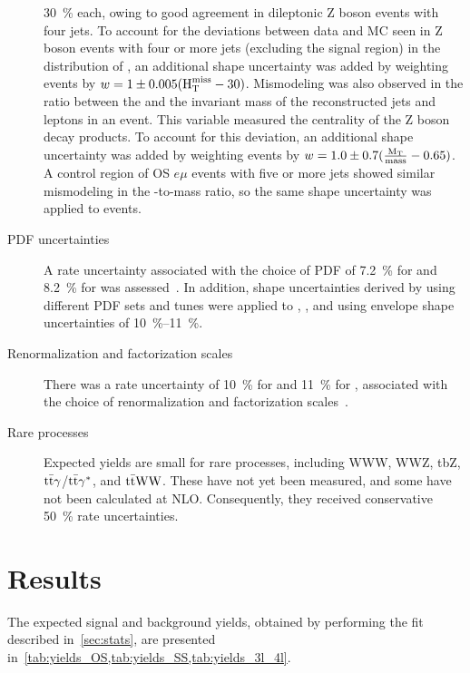 \begin{description}
    \SI{30}{\percent} each, owing to good agreement in dileptonic Z boson events
    with four jets. To account for the deviations between data and MC seen in Z
    boson events with four or more jets (excluding the \ttZ signal region) in
    the distribution of \HTmiss, an additional shape uncertainty was added by
    weighting events by $w = 1 \pm 0.005(\text{H}_\text{T}^\text{miss} - 30)$. Mismodeling was also
    observed in the ratio between the \MT and the invariant mass of the
    reconstructed jets and leptons in an event. This variable measured the
    centrality of the Z boson decay products. To account for this deviation, an
    additional shape uncertainty was added by weighting events by $w = 1.0 \pm
    0.7(\frac{\text{M}_\text{T}}{\text{mass}} - 0.65)$. A control region of OS $e\mu$ events
    with five or more jets showed similar mismodeling in the \MT-to-mass ratio,
    so the same shape uncertainty was applied to \ttbar events.
  \item[PDF uncertainties] A rate uncertainty associated with the choice of PDF
    of \SI{7.2}{\percent} for \ttW and \SI{8.2}{\percent} for \ttZ was
    assessed~\cite{Alekhin:2011sk, Botje:2011sn}. In addition, shape
    uncertainties derived by using different PDF sets and \pythia tunes were
    applied to \ttW, \ttZ, and \ttH using envelope shape uncertainties of
    \SIrange{10}{11}{\percent}.
  \item[Renormalization and factorization scales] There was a rate uncertainty of
    \SI{10}{\percent} for \ttW and \SI{11}{\percent} for \ttZ, associated with
    the choice of renormalization and factorization
    scales~\cite{Garzelli:2012bn}.
  \item[Rare processes] Expected yields are small for rare processes, including
    WWW, WWZ, tbZ, $\text{t}\bar{\text{t}}\gamma$/$\text{t}\bar{\text{t}}\gamma^{*}$, and $\text{t}\bar{\text{t}}\text{W}\text{W}$. These
    have not yet been measured, and some have not been calculated at NLO.
    Consequently,
    they received conservative \SI{50}{\percent} rate uncertainties.
\end{description}

\section{Results}
The expected signal and background yields, obtained by performing the fit
described in~\cref{sec:stats}, are presented
in~\cref{tab:yields_OS,tab:yields_SS,tab:yields_3l_4l}.

